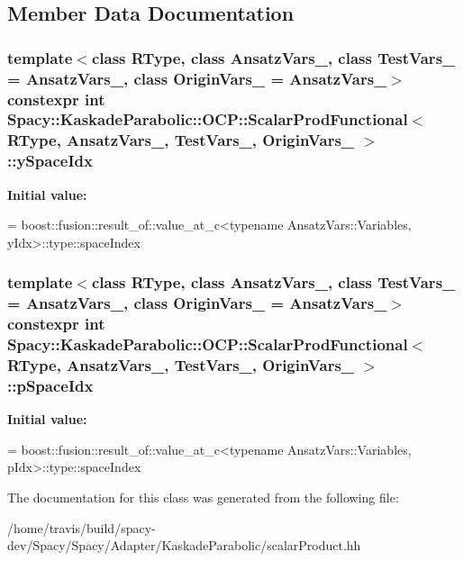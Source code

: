 \subsection{Member Data Documentation}
\hypertarget{classSpacy_1_1KaskadeParabolic_1_1OCP_1_1ScalarProdFunctional_a6de2f6357aaec3d4caa074a2d4e7f651}{
\subsubsection[{y\-Space\-Idx}]{\setlength{\rightskip}{0pt plus 5cm}template$<$class R\-Type, class Ansatz\-Vars\-\_\-, class Test\-Vars\-\_\- = Ansatz\-Vars\-\_\-, class Origin\-Vars\-\_\- = Ansatz\-Vars\-\_\-$>$ constexpr int {\bf Spacy\-::\-Kaskade\-Parabolic\-::\-O\-C\-P\-::\-Scalar\-Prod\-Functional}$<$ R\-Type, Ansatz\-Vars\-\_\-, Test\-Vars\-\_\-, Origin\-Vars\-\_\- $>$\-::y\-Space\-Idx\hspace{0.3cm}{\ttfamily [static]}}}\label{classSpacy_1_1KaskadeParabolic_1_1OCP_1_1ScalarProdFunctional_a6de2f6357aaec3d4caa074a2d4e7f651}
{\bfseries Initial value\-:}
\begin{DoxyCode}
= boost::fusion::result\_of::value\_at\_c<\textcolor{keyword}{typename} AnsatzVars::Variables,
        yIdx>::type::spaceIndex
\end{DoxyCode}
\hypertarget{classSpacy_1_1KaskadeParabolic_1_1OCP_1_1ScalarProdFunctional_a716615e7831c9bc73e423c49fe0ed885}{
\subsubsection[{p\-Space\-Idx}]{\setlength{\rightskip}{0pt plus 5cm}template$<$class R\-Type, class Ansatz\-Vars\-\_\-, class Test\-Vars\-\_\- = Ansatz\-Vars\-\_\-, class Origin\-Vars\-\_\- = Ansatz\-Vars\-\_\-$>$ constexpr int {\bf Spacy\-::\-Kaskade\-Parabolic\-::\-O\-C\-P\-::\-Scalar\-Prod\-Functional}$<$ R\-Type, Ansatz\-Vars\-\_\-, Test\-Vars\-\_\-, Origin\-Vars\-\_\- $>$\-::p\-Space\-Idx\hspace{0.3cm}{\ttfamily [static]}}}\label{classSpacy_1_1KaskadeParabolic_1_1OCP_1_1ScalarProdFunctional_a716615e7831c9bc73e423c49fe0ed885}
{\bfseries Initial value\-:}
\begin{DoxyCode}
= boost::fusion::result\_of::value\_at\_c<\textcolor{keyword}{typename} AnsatzVars::Variables,
        pIdx>::type::spaceIndex
\end{DoxyCode}


The documentation for this class was generated from the following file\-:\begin{DoxyCompactItemize}
\item 
/home/travis/build/spacy-\/dev/\-Spacy/\-Spacy/\-Adapter/\-Kaskade\-Parabolic/scalar\-Product.\-hh\end{DoxyCompactItemize}
